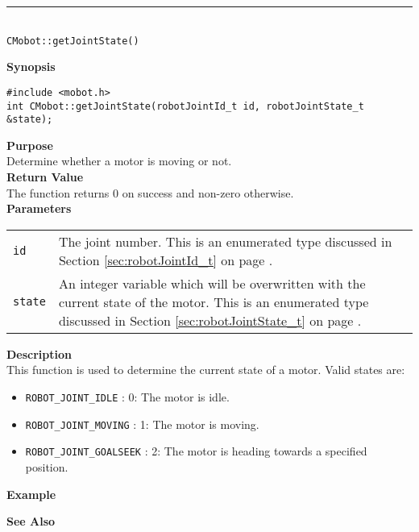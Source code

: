 \noindent
\vspace{5pt}
\rule{4.5in}{0.015in}\\
\noindent
{\LARGE \texttt{CMobot::getJointState()}}\\
{}

\noindent
{\bf Synopsis}\\
\begin{verbatim}
#include <mobot.h>
int CMobot::getJointState(robotJointId_t id, robotJointState_t &state);
\end{verbatim}

\noindent
{\bf Purpose}\\
Determine whether a motor is moving or not.\\

\noindent
{\bf Return Value}\\
The function returns 0 on success and non-zero otherwise.\\

\noindent
{\bf Parameters}
\vspace{-0.1in}
\begin{description}
\item               
\begin{tabular}{p{10 mm}p{145 mm}}
\texttt{id} & The joint number. This is an enumerated type 
discussed in Section \ref{sec:robotJointId_t} on page
\pageref{sec:robotJointId_t}.\\
\texttt{state} & An integer variable which will be overwritten with the current state of the motor. 
This is an enumerated type 
discussed in Section \ref{sec:robotJointState_t} on page
\pageref{sec:robotJointState_t}.
\end{tabular}
\end{description}

\noindent
{\bf Description}\\
This function is used to determine the current state of a motor. Valid states are:
\begin{itemize}
\item \texttt{ROBOT\_JOINT\_IDLE} : 0: The motor is idle.
\item \texttt{ROBOT\_JOINT\_MOVING} : 1: The motor is moving.
\item \texttt{ROBOT\_JOINT\_GOALSEEK} : 2: The motor is heading towards a specified position.
\end{itemize}

\noindent
{\bf Example}\\
\noindent

\noindent
{\bf See Also}\\

